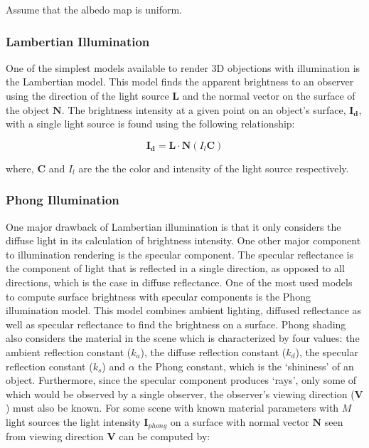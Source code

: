 \documentclass[11pt]{article}
\begin{document}
Assume that the albedo map is uniform.

    \subsubsection{Lambertian Illumination}\label{lambertian-illumination}

One of the simplest models available to render 3D objections with
illumination is the Lambertian model. This model finds the apparent
brightness to an observer using the direction of the light source
\(\mathbf{L}\) and the normal vector on the surface of the object
\(\mathbf{N}\). The brightness intensity at a given point on an object's
surface, \(\mathbf{I_d}\), with a single light source is found using the
following relationship:

\[\mathbf{I_d} = \mathbf{L} \cdot \mathbf{N} (I_l\mathbf{C})\]

where, \(\mathbf{C}\) and \(I_l\) are the the color and intensity of the
light source respectively.

\subsubsection{Phong Illumination}\label{phong-illumination}

One major drawback of Lambertian illumination is that it only considers
the diffuse light in its calculation of brightness intensity. One other
major component to illumination rendering is the specular component. The
specular reflectance is the component of light that is reflected in a
single direction, as opposed to all directions, which is the case in
diffuse reflectance. One of the most used models to compute surface
brightness with specular components is the Phong illumination model.
This model combines ambient lighting, diffused reflectance as well as
specular reflectance to find the brightness on a surface. Phong shading
also considers the material in the scene which is characterized by four
values: the ambient reflection constant (\(k_a\)), the diffuse
reflection constant (\(k_d\)), the specular reflection constant
(\(k_s\)) and \(\alpha\) the Phong constant, which is the `shininess' of
an object. Furthermore, since the specular component produces `rays',
only some of which would be observed by a single observer, the
observer's viewing direction (\(\mathbf{V}\)) must also be known. For
some scene with known material parameters with \(M\) light sources the
light intensity \(\mathbf{I}_{phong}\) on a surface with normal vector
\(\mathbf{N}\) seen from viewing direction \(\mathbf{V}\) can be
computed by:
\end{document}
